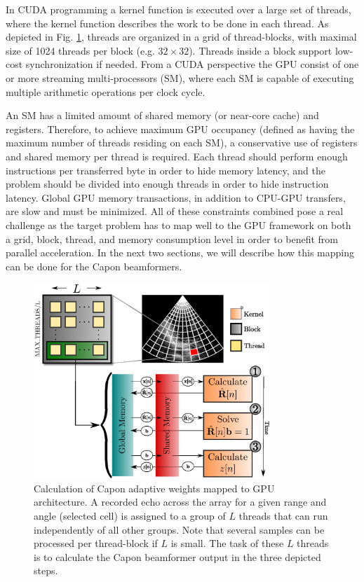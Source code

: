 \documentclass[journal]{IEEEtran}
\begin{document}
In CUDA programming a kernel function is executed over a large set of threads, where the kernel function describes the work to be done in each thread. As depicted in Fig. \ref{fig:gpulayout}, threads are organized in a grid of thread-blocks, with maximal size of 1024 threads per block (e.g. $32\times32$). Threads inside a block support low-cost synchronization if needed. From a CUDA perspective the GPU consist of one or more streaming multi-processors (SM), where each SM is capable of executing multiple arithmetic operations per clock cycle.

An SM has a limited amount of shared memory (or near-core cache) and registers. Therefore, to achieve maximum GPU occupancy (defined as having the maximum number of threads residing on each SM), a conservative use of registers and shared memory per thread is required. Each thread should perform enough instructions per transferred byte in order to hide memory latency, and the problem should be divided into enough threads in order to hide instruction latency. Global GPU memory transactions, in addition to CPU-GPU transfers, are slow and must be minimized. All of these constraints combined pose a real challenge as the target problem has to map well to the GPU framework on both a grid, block, thread, and memory consumption level in order to benefit from parallel acceleration. In the next two sections, we will describe how this mapping can be done for the Capon beamformers.    

\begin{figure}
\centerline{\includegraphics[width=3.5in]{gfx/gpu_layout_vertical_2.eps}}
\caption{Calculation of Capon adaptive weights mapped to GPU architecture. A recorded echo across the array for a given range and angle (selected cell) is assigned to a group of $L$ threads that can run independently of all other groups. Note that several samples can be processed per thread-block if $L$ is small. The task of these $L$ threads is to calculate the Capon beamformer output in the three depicted steps.}
\label{fig:gpulayout}
\end{figure}
\end{document}
